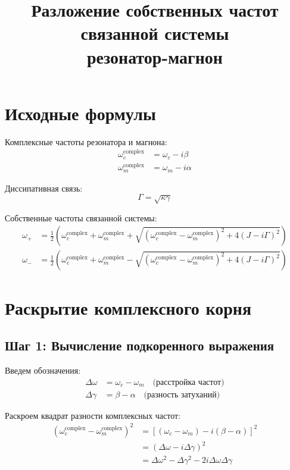\documentclass[12pt,a4paper]{article}
\title{Разложение собственных частот связанной системы\\резонатор-магнон}
\author{}
\date{}
\begin{document}
\maketitle

\section{Исходные формулы}

Комплексные частоты резонатора и магнона:
\begin{align}
\omega_c^{\text{complex}} &= \omega_c - i\beta \\
\omega_m^{\text{complex}} &= \omega_m - i\alpha
\end{align}

Диссипативная связь:
\begin{equation}
\Gamma = \sqrt{\kappa \gamma}
\end{equation}

Собственные частоты связанной системы:
\begin{align}
\omega_+ &= \frac{1}{2}\left(\omega_c^{\text{complex}} + \omega_m^{\text{complex}} + \sqrt{(\omega_c^{\text{complex}} - \omega_m^{\text{complex}})^2 + 4(J - i\Gamma)^2}\right) \\
\omega_- &= \frac{1}{2}\left(\omega_c^{\text{complex}} + \omega_m^{\text{complex}} - \sqrt{(\omega_c^{\text{complex}} - \omega_m^{\text{complex}})^2 + 4(J - i\Gamma)^2}\right)
\end{align}

\section{Раскрытие комплексного корня}

\subsection{Шаг 1: Вычисление подкоренного выражения}

Введем обозначения:
\begin{align}
\Delta\omega &= \omega_c - \omega_m \quad \text{(расстройка частот)} \\
\Delta\gamma &= \beta - \alpha \quad \text{(разность затуханий)}
\end{align}

Раскроем квадрат разности комплексных частот:
\begin{align}
(\omega_c^{\text{complex}} - \omega_m^{\text{complex}})^2 &= [(\omega_c - \omega_m) - i(\beta - \alpha)]^2 \nonumber \\
&= (\Delta\omega - i\Delta\gamma)^2 \nonumber \\
&= \Delta\omega^2 - \Delta\gamma^2 - 2i\Delta\omega\Delta\gamma
\end{align}
\end{document}
